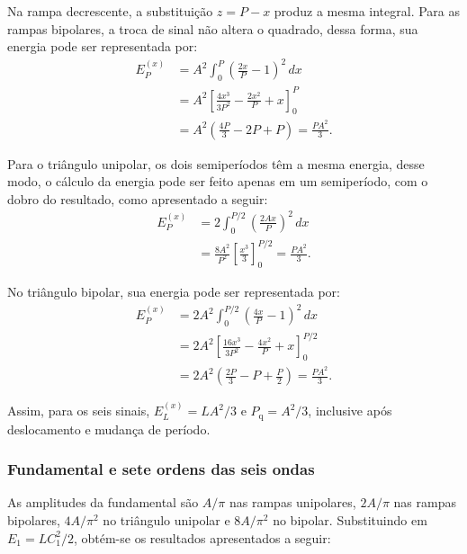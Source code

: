 Na rampa decrescente, a substituição $z=P-x$ produz a mesma integral.
Para as rampas bipolares, a troca de sinal não altera o quadrado, dessa forma, sua energia pode ser representada por:
\begin{equation}
    \begin{aligned}
        E_P^{(x)}&=A^2\int_0^P\left(\frac{2x}{P}-1\right)^2\,dx \\
            &=A^2\left[\frac{4x^3}{3P^2}-\frac{2x^2}{P}+x\right]_0^P \\
            &=A^2\left(\frac{4P}{3}-2P+P\right)=\frac{PA^2}{3}.
    \end{aligned}
\end{equation}

Para o triângulo unipolar, os dois semiperíodos têm a mesma energia, desse modo, o cálculo da energia pode ser feito apenas em um semiperíodo, com o dobro do resultado, como apresentado a seguir:
\begin{equation}
    \begin{aligned}
        E_P^{(x)}&=2\int_0^{P/2}\left(\frac{2Ax}{P}\right)^2\,dx \\
            &=\frac{8A^2}{P^2}\left[\frac{x^3}{3}\right]_0^{P/2}
            =\frac{PA^2}{3}.
    \end{aligned}
\end{equation}

No triângulo bipolar, sua energia pode ser representada por:
\begin{equation}
    \begin{aligned}
        E_P^{(x)}&=2A^2\int_0^{P/2}\left(\frac{4x}{P}-1\right)^2\,dx \\
            &=2A^2\left[\frac{16x^3}{3P^2}-\frac{4x^2}{P}+x\right]_0^{P/2} \\
            &=2A^2\left(\frac{2P}{3}-P+\frac P2\right)=\frac{PA^2}{3}.
    \end{aligned}
\end{equation}

Assim, para os seis sinais, $E_L^{(x)}=LA^2/3$ e
$P_{\mathrm{q}}=A^2/3$, inclusive após deslocamento e mudança de período.

\subsubsection{Fundamental e sete ordens das seis ondas}
As amplitudes da fundamental são $A/\pi$ nas rampas unipolares,
$2A/\pi$ nas rampas bipolares, $4A/\pi^2$ no triângulo unipolar e
$8A/\pi^2$ no bipolar. Substituindo em $E_1=LC_1^2/2$, obtém-se os resultados apresentados a seguir:

